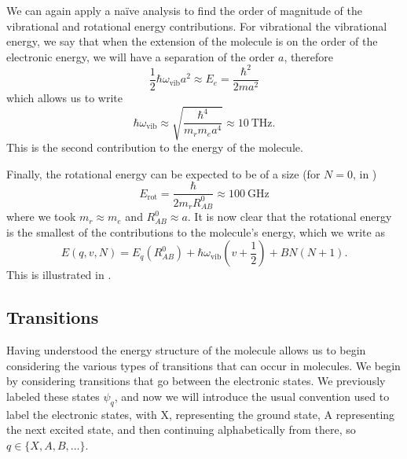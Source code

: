 We can again apply a na\"ive analysis to find the order of magnitude of the
vibrational and rotational energy contributions. For vibrational the
vibrational energy, we say that when the extension of the molecule is on the
order of the electronic energy, we will have a separation of the order $a$,
therefore
%
\begin{equation}
  \frac{1}{2}\hbar\omega_\text{vib}a^2 \approx E_e = \frac{\hbar^2}{2ma^2}
\end{equation}
%
which allows us to write
%
\begin{equation}
  \hbar\omega_\text{vib} \approx \sqrt{\frac{\hbar^4}{m_r m_e a^4}} \approx
    \SI{10}{\tera\hertz}.
\end{equation}
%
This is the second contribution to the energy of the molecule.

Finally, the rotational energy can be expected to be of a size (for $N=0$, in
)
%
\begin{equation}
  E_\text{rot} = \frac{\hbar}{2 m_r R^0_{AB}} \approx \SI{100}{\giga\hertz}
\end{equation}
%
where we took $m_r\approx m_e$ and $R^0_{AB}\approx a$. It is now clear that the
rotational energy is the smallest of the contributions to the molecule's
energy, which we write as
%
\begin{equation}
  E(q, v, N) = E_q(R^0_{AB}) + \hbar\omega_\text{vib}\left(v +
    \frac{1}{2}\right) + B N(N+1).
\end{equation}
%
This is illustrated in .

\subsection{Transitions}


Having understood the energy structure of the molecule allows us to begin
considering the various types of transitions that can occur in molecules. We
begin by considering transitions that go between the electronic states. We
previously labeled these states $\psi_q$, and now we will introduce the usual
convention used to label the electronic states, with X, representing the ground
state, A representing the next excited state, and then continuing
alphabetically from there, so $q\in\{X,A,B,\ldots\}$.

